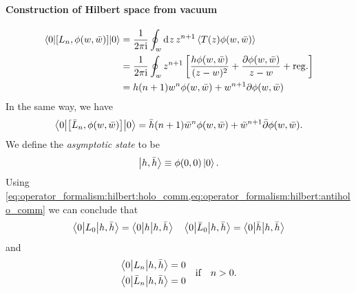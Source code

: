 \documentclass[10pt]{article}
\newcommand{\ii}{\mathrm{i}}
\begin{document}
\paragraph{Construction of Hilbert space from vacuum}
\begin{align}
    \ev**{\comm{L_n}{\phi(w,\bar{w})}}{0} & =\frac{1}{2\pi\ii}\oint_w\dd[]{z}z^{n+1}\expval{T(z)\phi(w,\bar{w})}\notag                                                             \\
                                          & =\frac{1}{2\pi\ii}\oint_w z^{n+1}\left[\frac{h\phi(w,\bar{w})}{(z-w)^2}+\frac{\partial\phi(w,\bar{w})}{z-w}+\mathrm{reg.}\right]\notag \\
                                          & =h(n+1)w^n\phi(w,\bar{w})+w^{n+1}\partial\phi(w,\bar{w})\label{eq:operator_formalism:hilbert:holo_comm}
\end{align}
In the same way, we have
\begin{align}
    \ev**{\comm{\bar{L}_n}{\phi(w,\bar{w})}}{0}=\bar{h}(n+1)\bar{w}^n\phi(w,\bar{w})+\bar{w}^{n+1}\bar{\partial}\phi(w,\bar{w}).\label{eq:operator_formalism:hilbert:antiholo_comm}
\end{align}
We define the \textit{asymptotic state} to be
\begin{align}
    \ket{h,\bar{h}}\equiv\phi(0,0)\ket{0}.
\end{align}
Using \cref{eq:operator_formalism:hilbert:holo_comm,eq:operator_formalism:hilbert:antiholo_comm} we can conclude that
\begin{align}
    \mel**{0}{L_0}{h,\bar{h}}=\mel**{0}{h}{h,\bar{h}}\quad\mel**{0}{\bar{L}_0}{h,\bar{h}}=\mel**{0}{\bar{h}}{h,\bar{h}}
\end{align}
and
\begin{align}
    \begin{aligned}
        \mel**{0}{L_n}{h,\bar{h}}       & =0 \\
        \mel**{0}{\bar{L}_n}{h,\bar{h}} & =0
    \end{aligned}\qif n>0.
\end{align}
\end{document}
